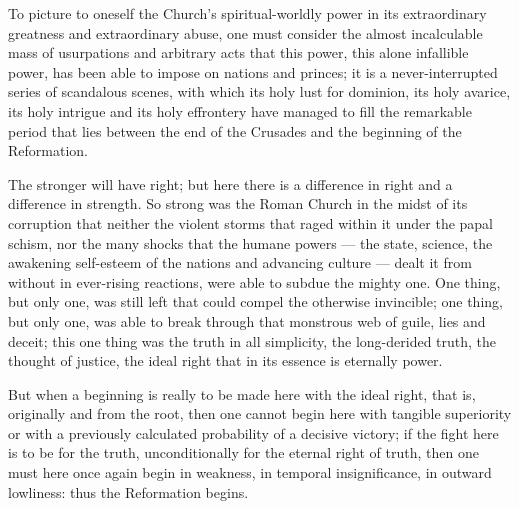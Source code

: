 \documentclass[12pt,a4paper,openany]{book}
\newcommand{\opage}[1]{\marginnote{\footnotesize\textit{[#1]}}}
\begin{document}
To picture to oneself the Church's spiritual-worldly power in
its extraordinary greatness and extraordinary abuse,
one must consider the almost incalculable mass of usurpations
and arbitrary acts that this power, this alone infallible
power, has been able to impose on nations and princes;
it is a never-interrupted series of scandalous scenes, with which
its holy lust for dominion, its holy avarice, its holy
intrigue and its holy effrontery have managed to fill
the remarkable period that lies between the end of the Crusades
and the beginning of the Reformation.

The stronger will have right; but here there is a difference in
right and a difference in strength. So strong was the Roman Church
in the midst of its corruption that neither the violent storms that
\opage{11}raged within it under the papal schism, nor the
many shocks that the humane powers --- the state, science,
the awakening self-esteem of the nations and advancing
culture --- dealt it from without in ever-rising reactions,
were able to subdue the mighty one. One thing, but only
one, was still left that could compel the otherwise invincible; one thing, but only one, was able to break through
that monstrous web of guile, lies and deceit; this
one thing was the truth in all simplicity, the long-derided
truth, the thought of justice, the ideal right that in its
essence is eternally power.

But when a beginning is really to be made here with the ideal
right, that is, originally and from the root, then one cannot begin
here with tangible superiority or with a previously calculated
probability of a decisive victory; if the fight here is to be
for the truth, unconditionally for the eternal right of truth, then
one must here once again begin in weakness, in temporal insignificance,
in outward lowliness: thus the Reformation begins.
\end{document}
